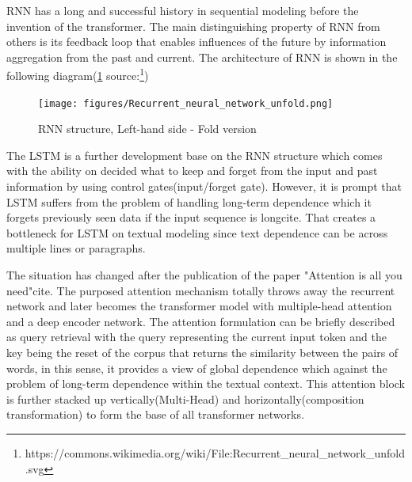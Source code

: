\documentclass[12pt]{article}
\begin{document}
RNN has a long and successful history in sequential modeling before the invention of the transformer. The main distinguishing property of RNN from others is its feedback loop that enables influences of the future by information aggregation from the past and current. The architecture of RNN is shown in the following diagram(\ref{fig:RNN} source:\footnote{https://commons.wikimedia.org/wiki/File:Recurrent\_neural\_network\_unfold.svg})

\begin{figure} [!h]
\begin{center}
\texttt{[image: figures/Recurrent\_neural\_network\_unfold.png]}
\caption{RNN structure, Left-hand side - Fold version}
\label{fig:RNN}
\end{center}
\end{figure}
The LSTM is a further development base on the RNN structure which comes with the ability on decided what to keep and forget from the input and past information by using control gates(input/forget gate). However, it is prompt that LSTM suffers from the problem of handling long-term dependence which it forgets previously seen data if the input sequence is long{cite}. That creates a bottleneck for LSTM on textual modeling since text dependence can be across multiple lines or paragraphs. 

The situation has changed after the publication of the paper "Attention is all you need"{cite}. The purposed attention mechanism totally throws away the recurrent network and later becomes the transformer model with multiple-head attention and a deep encoder network. The attention formulation can be briefly described as query retrieval with the query representing the current input token and the key being the reset of the corpus that returns the similarity between the pairs of words, in this sense, it provides a view of global dependence which against the problem of long-term dependence within the textual context. This attention block is further stacked up vertically(Multi-Head) and horizontally(composition transformation) to form the base of all transformer networks.   
\end{document}
